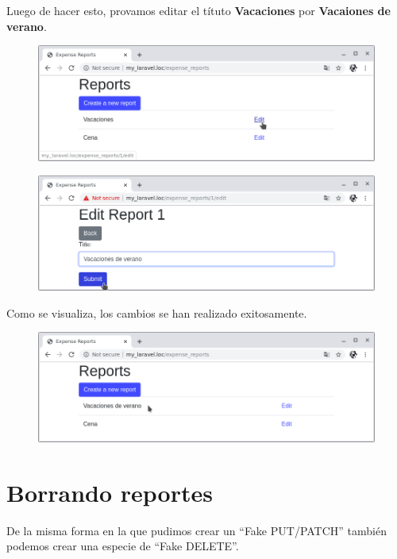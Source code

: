 \documentclass{article}
\begin{document}
Luego de hacer esto, provamos editar el títuto \textbf{Vacaciones} por
\textbf{Vacaiones de verano}.\\

\begin{figure}[h!]
  \centering
  \includegraphics[scale=0.5]{./Pictures/074_edit_vacaciones.png}
\end{figure}

\begin{figure}[h!]
  \centering
  \includegraphics[scale=0.5]{./Pictures/075_vacaciones_verano.png}
\end{figure}

Como se visualiza, los cambios se han realizado exitosamente.

\begin{figure}[h!]
  \centering
  \includegraphics[scale=0.5]{./Pictures/076_update_ok.png}
\end{figure}




\section{Borrando reportes}%
De la misma forma en la que pudimos crear un “Fake PUT/PATCH” también podemos
crear una especie de “Fake DELETE”.\\
\end{document}
